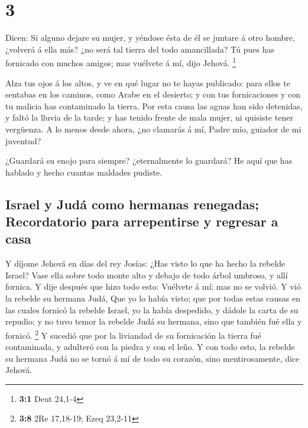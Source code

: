 \hypertarget{section-2}{%
\section{3}\label{section-2}}

 Dicen: Si alguno dejare su mujer, y yéndose ésta de él se
juntare á otro hombre, ¿volverá á ella más? ¿no será tal tierra del todo
amancillada? Tú pues has fornicado con muchos amigos; mas vuélvete á mí,
dijo Jehová. \footnote{\textbf{3:1} Deut 24,1-4}

 Alza tus ojos á los altos, y ve en qué lugar no te hayas
publicado: para ellos te sentabas en los caminos, como Arabe en el
desierto; y con tus fornicaciones y con tu malicia has contaminado la
tierra.  Por esta causa las aguas han sido detenidas, y
faltó la lluvia de la tarde; y has tenido frente de mala mujer, ni
quisiste tener vergüenza.  A lo menos desde ahora, ¿no
clamarás á mí, Padre mío, guiador de mi juventud?

 ¿Guardará su enojo para siempre? ¿eternalmente lo guardará?
He aquí que has hablado y hecho cuantas maldades pudiste.

\hypertarget{israel-y-juduxe1-como-hermanas-renegadas-recordatorio-para-arrepentirse-y-regresar-a-casa}{%
\subsection{Israel y Judá como hermanas renegadas; Recordatorio para
arrepentirse y regresar a
casa}\label{israel-y-juduxe1-como-hermanas-renegadas-recordatorio-para-arrepentirse-y-regresar-a-casa}}

 Y díjome Jehová en días del rey Josías: ¿Has visto lo que
ha hecho la rebelde Israel? Vase ella sobre todo monte alto y debajo de
todo árbol umbroso, y allí fornica.  Y dije después que hizo
todo esto: Vuélvete á mí; mas no se volvió. Y vió la rebelde su hermana
Judá,  Que yo lo había visto; que por todas estas causas en
las cuales fornicó la rebelde Israel, yo la había despedido, y dádole la
carta de su repudio; y no tuvo temor la rebelde Judá su hermana, sino
que también fué ella y fornicó. \footnote{\textbf{3:8} 2Re 17,18-19;
  Ezeq 23,2-11}  Y sucedió que por la liviandad de su
fornicación la tierra fué contaminada, y adulteró con la piedra y con el
leño.  Y con todo esto, la rebelde su hermana Judá no se
tornó á mí de todo su corazón, sino mentirosamente, dice Jehová.

